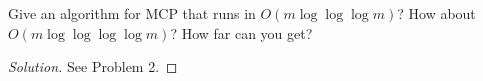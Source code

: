     \begin{thm}{}{}
        Give an algorithm for MCP that runs in $O(m\log\log\log m)$? How about $O(m\log\log\log\log m)$?
        How far can you get?
    \end{thm}
    \begin{proof}[Solution]
        See Problem 2.
    \end{proof}


